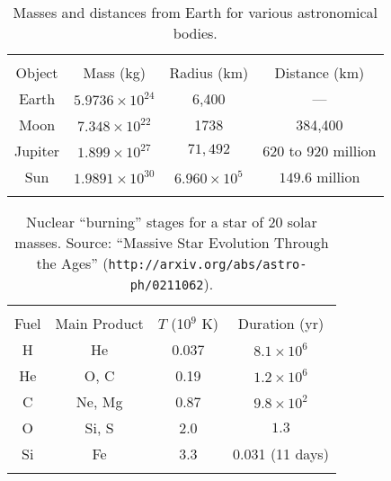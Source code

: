 \documentclass[12pt]{article}
\begin{document}
\begin{table}[!h]
\begin{tabular}{cccc}
\hline\hline\\
Object & Mass (kg) & Radius (km) & Distance (km) \\
\hline
Earth & $5.9736\times10^{24}$ & 6,400 & --- \\
Moon & $7.348\times10^{22}$ & 1738 & 384,400\\
Jupiter & $1.899\times10^{27}$ & $71,492$ & 620 to 920 million \\
Sun & $1.9891\times10^{30}$ & $6.960\times10^5$ & $149.6$ million \\
\hline\hline\\
\end{tabular}
\caption{Masses and distances from Earth for various astronomical bodies.}
\end{table}

\begin{table}[!h]
\begin{tabular}{cccc}
\hline\hline\\
Fuel & Main Product & $T$ (10$^9$ K) & Duration (yr)\\
\hline
H & He & 0.037 & $8.1\times10^6$\\
He & O, C & 0.19 & $1.2\times10^6$\\
C & Ne, Mg & 0.87 & $9.8\times10^2$\\
O & Si, S & 2.0 & $1.3$\\
Si & Fe & 3.3 & 0.031 (11 days)\\
\hline\hline\\
\end{tabular}
\caption{Nuclear ``burning'' stages for a star of 20 solar masses.
Source: ``Massive Star Evolution Through the Ages''
({\tt http://arxiv.org/abs/astro-ph/0211062}).}
\end{table}
\end{document}
